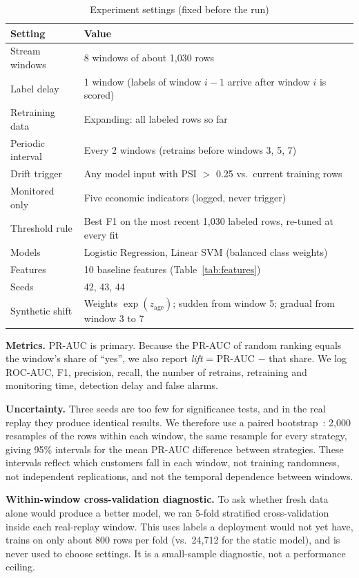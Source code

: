 \documentclass[conference]{IEEEtran}
\begin{document}
\begin{table}[t]
\caption{Experiment settings (fixed before the run)}
\label{tab:settings}
\centering
\footnotesize
\begin{tabular}{@{}p{3.1cm}p{4.7cm}@{}}
\toprule
Setting & Value \\
\midrule
Stream windows & 8 windows of about 1,030 rows \\
Label delay & 1 window (labels of window $i-1$ arrive after window $i$ is scored) \\
Retraining data & Expanding: all labeled rows so far \\
Periodic interval & Every 2 windows (retrains before windows 3, 5, 7) \\
Drift trigger & Any model input with PSI $>$ 0.25 vs.\ current training rows \\
Monitored only & Five economic indicators (logged, never trigger) \\
Threshold rule & Best F1 on the most recent 1,030 labeled rows, re-tuned at every fit \\
Models & Logistic Regression, Linear SVM (balanced class weights) \\
Features & 10 baseline features (Table~\ref{tab:features}) \\
Seeds & 42, 43, 44 \\
Synthetic shift & Weights $\exp(z_{\text{age}})$; sudden from window 5; gradual from window 3 to 7 \\
\bottomrule
\end{tabular}
\end{table}

\textbf{Metrics.} PR-AUC is primary. Because the PR-AUC of random ranking equals the window's share of ``yes'', we also report \emph{lift} = PR-AUC $-$ that share. We log ROC-AUC, F1, precision, recall, the number of retrains, retraining and monitoring time, detection delay and false alarms.

\textbf{Uncertainty.} Three seeds are too few for significance tests, and in the real replay they produce identical results. We therefore use a paired bootstrap~\cite{efron1979bootstrap}: 2,000 resamples of the rows within each window, the same resample for every strategy, giving 95\% intervals for the mean PR-AUC difference between strategies. These intervals reflect which customers fall in each window, not training randomness, not independent replications, and not the temporal dependence between windows.

\textbf{Within-window cross-validation diagnostic.} To ask whether fresh data alone would produce a better model, we ran 5-fold stratified cross-validation inside each real-replay window. This uses labels a deployment would not yet have, trains on only about 800 rows per fold (vs.\ 24,712 for the static model), and is never used to choose settings. It is a small-sample diagnostic, not a performance ceiling.
\end{document}
